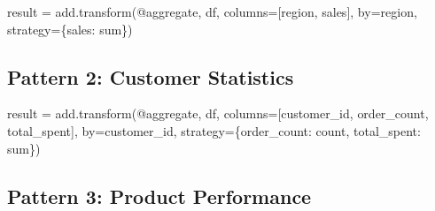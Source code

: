 \documentclass[
  letterpaper,
]{scrbook}
\newenvironment{Shaded}{\begin{snugshade}}{\end{snugshade}}
\newcommand{\NormalTok}[1]{\textcolor[rgb]{0.00,0.23,0.31}{#1}}
\newcommand{\OperatorTok}[1]{\textcolor[rgb]{0.37,0.37,0.37}{#1}}
\newcommand{\StringTok}[1]{\textcolor[rgb]{0.13,0.47,0.30}{#1}}
\begin{document}
\begin{Shaded}
\begin{Highlighting}[]
\NormalTok{result }\OperatorTok{=}\NormalTok{ add.transform(}\StringTok{\textquotesingle{}@aggregate\textquotesingle{}}\NormalTok{, df, }
\NormalTok{                       columns}\OperatorTok{=}\NormalTok{[}\StringTok{\textquotesingle{}region\textquotesingle{}}\NormalTok{, }\StringTok{\textquotesingle{}sales\textquotesingle{}}\NormalTok{],}
\NormalTok{                       by}\OperatorTok{=}\StringTok{\textquotesingle{}region\textquotesingle{}}\NormalTok{,}
\NormalTok{                       strategy}\OperatorTok{=}\NormalTok{\{}\StringTok{\textquotesingle{}sales\textquotesingle{}}\NormalTok{: }\StringTok{\textquotesingle{}sum\textquotesingle{}}\NormalTok{\})}
\end{Highlighting}
\end{Shaded}

\subsection{Pattern 2: Customer
Statistics}\label{pattern-2-customer-statistics}

\begin{Shaded}
\begin{Highlighting}[]
\NormalTok{result }\OperatorTok{=}\NormalTok{ add.transform(}\StringTok{\textquotesingle{}@aggregate\textquotesingle{}}\NormalTok{, df,}
\NormalTok{                       columns}\OperatorTok{=}\NormalTok{[}\StringTok{\textquotesingle{}customer\_id\textquotesingle{}}\NormalTok{, }\StringTok{\textquotesingle{}order\_count\textquotesingle{}}\NormalTok{, }\StringTok{\textquotesingle{}total\_spent\textquotesingle{}}\NormalTok{],}
\NormalTok{                       by}\OperatorTok{=}\StringTok{\textquotesingle{}customer\_id\textquotesingle{}}\NormalTok{,}
\NormalTok{                       strategy}\OperatorTok{=}\NormalTok{\{}\StringTok{\textquotesingle{}order\_count\textquotesingle{}}\NormalTok{: }\StringTok{\textquotesingle{}count\textquotesingle{}}\NormalTok{, }\StringTok{\textquotesingle{}total\_spent\textquotesingle{}}\NormalTok{: }\StringTok{\textquotesingle{}sum\textquotesingle{}}\NormalTok{\})}
\end{Highlighting}
\end{Shaded}

\subsection{Pattern 3: Product
Performance}\label{pattern-3-product-performance}
\end{document}
